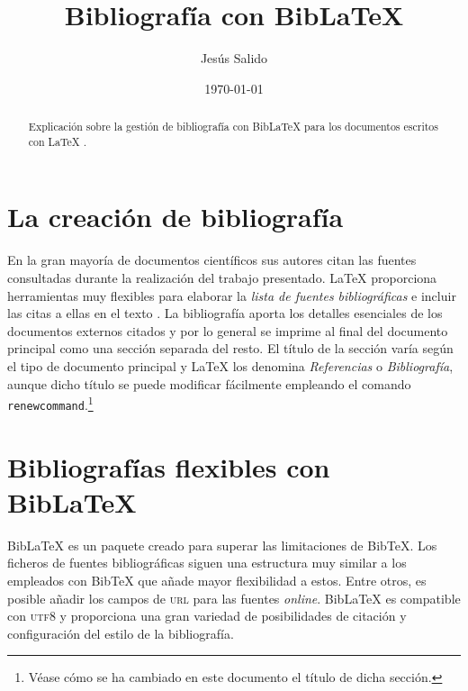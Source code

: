 \documentclass[11pt,a4paper]{article}
\author{Jesús Salido}
\title{Bibliografía con Bib\LaTeX{}}
\date{\today}
\begin{document}
\maketitle


\begin{abstract}
Explicación sobre la gestión de bibliografía con Bib\LaTeX{} para los documentos escritos con \LaTeX{} \cite{wikibookLaTex10}.
\end{abstract}

\tableofcontents

\section{La creación de bibliografía}
En la gran mayoría de documentos científicos \cite[ver][5]{salido15} sus autores citan las fuentes consultadas durante la realización del trabajo presentado. \LaTeX{} proporciona herramientas muy flexibles para elaborar la \emph{lista de fuentes bibliográficas} e incluir las citas a ellas en el texto \cite[ver][]{lamport94,cascales00,cascales03,goos04,kopka04}. La bibliografía aporta los detalles esenciales de los documentos externos citados y por lo general se imprime al final del documento principal como una sección separada del resto. El título de la sección varía según el tipo de documento principal y \LaTeX{} los denomina \emph{Referencias} o \emph{Bibliografía}, aunque dicho título se puede modificar fácilmente empleando el comando \texttt{renewcommand}.\footnote{Véase cómo se ha cambiado en este documento el título de dicha sección.}




\section{Bibliografías flexibles con Bib\LaTeX}
Bib\LaTeX{} es un paquete creado para superar las limitaciones de Bib\TeX. Los ficheros de fuentes bibliográficas siguen una estructura muy similar a los empleados con Bib\TeX{} que añade mayor flexibilidad a estos. Entre otros, es posible añadir los campos de \textsc{url} para las fuentes \emph{online}. Bib\LaTeX{} es compatible con \textsc{utf8} y proporciona una gran variedad de posibilidades de citación y configuración del estilo de la bibliografía. 




\nocite{*} %
\printbibliography[title=Bibliografía]
\end{document}
